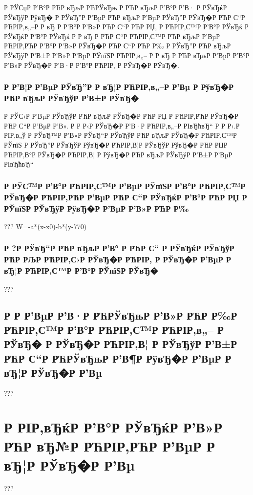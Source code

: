 \documentclass[a4paper,14pt]{extarticle}
\begin{document}
	Р  РЎСџР  Р’В°Р РЋР вЂљР РЋРЎвЂњ Р РЋР вЂљР  Р’В°Р  Р’В· Р  РЎвЂќР  РЎвЂўР  РўвЂ� Р  РЎвЂ”Р  Р’ВµР РЋР вЂљР  Р’ВµР  РЎвЂ”Р  РЎвЂ�Р РЋР С“Р РЋРІР‚в„–Р  Р вЂ Р  Р’В°Р  Р’В»Р РЋР С“Р РЋР РЏ, Р РЋРІР‚С™Р  Р’В°Р  РЎвЂќ Р  РЎвЂќР  Р’В°Р  РЎвЂќ Р  Р вЂ Р РЋР С“Р РЋРІР‚С™Р РЋР вЂљР  Р’ВµР РЋРІР‚РЋР  Р’В°Р  Р’В»Р  РЎвЂ�Р РЋР С“Р РЋР Р‰ Р  РЎвЂ”Р РЋР вЂљР  РЎвЂўР  Р’В±Р  Р’В»Р  Р’ВµР  РЎпїЅР РЋРІР‚в„– Р  Р вЂ  Р РЋР вЂљР  Р’ВµР  Р’В°Р  Р’В»Р  РЎвЂ�Р  Р’В·Р  Р’В°Р РЋРІР‚ Р  РЎвЂ�Р  РЎвЂ�. 

\clearpage
\subsubsection{Р  Р’В¦Р  Р’ВµР  РЎвЂ”Р  Р вЂ¦Р РЋРІР‚в„–Р  Р’Вµ Р  РўвЂ�Р РЋР вЂљР  РЎвЂўР  Р’В±Р  РЎвЂ�}
	Р  РЎС›Р  Р’ВµР  РЎвЂўР РЋР вЂљР  РЎвЂ�Р РЋР РЏ Р РЋРІР‚РЋР  РЎвЂ�Р РЋР С“Р  Р’ВµР  Р’В». Р  Р Р‹Р  РЎвЂ�Р  Р’В·Р РЋРІР‚в„–Р  РІвЂћвЂ“ Р  Р Р‹.Р  РІР‚в„ў
	Р  РЎвЂ™Р  Р’В»Р  РЎвЂ“Р  РЎвЂўР РЋР вЂљР  РЎвЂ�Р РЋРІР‚С™Р  РЎпїЅ Р  РЎвЂ”Р  РЎвЂўР  РўвЂ�Р РЋРІР‚В¦Р  РЎвЂўР  РўвЂ�Р РЋР РЏР РЋРІР‚В°Р  РЎвЂ�Р РЋРІР‚В¦ Р  РўвЂ�Р РЋР вЂљР  РЎвЂўР  Р’В±Р  Р’ВµР  РІвЂћвЂ“ 

\clearpage
\subsubsection{Р  РЎС™Р  Р’В°Р РЋРІР‚С™Р  Р’ВµР  РЎпїЅР  Р’В°Р РЋРІР‚С™Р  РЎвЂ�Р РЋРІР‚РЋР  Р’ВµР РЋР С“Р  РЎвЂќР  Р’В°Р РЋР РЏ Р  РЎпїЅР  РЎвЂўР  РўвЂ�Р  Р’ВµР  Р’В»Р РЋР Р‰}
	???
	W=-a*(x-x0)-b*(y-770)

\clearpage
\subsubsection{Р  ?Р  РЎвЂ“Р РЋР вЂљР  Р’В° Р РЋР С“ Р  РЎвЂќР  РЎвЂўР РЋР РЉР РЋРІР‚С›Р  РЎвЂ�Р РЋРІР‚ Р  РЎвЂ�Р  Р’ВµР  Р вЂ¦Р РЋРІР‚С™Р  Р’В°Р  РЎпїЅР  РЎвЂ�}
	???

\clearpage
\subsection{Р   Р  Р’ВµР  Р’В·Р РЋРЎвЂњР  Р’В»Р РЋР Р‰Р РЋРІР‚С™Р  Р’В°Р РЋРІР‚С™Р РЋРІР‚в„– Р  РЎвЂ� Р  РЎвЂ�Р РЋРІР‚В¦ Р  РЎвЂўР  Р’В±Р РЋР С“Р РЋРЎвЂњР  Р’В¶Р  РўвЂ�Р  Р’ВµР  Р вЂ¦Р  РЎвЂ�Р  Р’Вµ}
	???
\clearpage

\section{Р  РІР‚вЂќР  Р’В°Р  РЎвЂќР  Р’В»Р РЋР вЂ№Р РЋРІР‚РЋР  Р’ВµР  Р вЂ¦Р  РЎвЂ�Р  Р’Вµ}
	???
\clearpage
\end{document}
